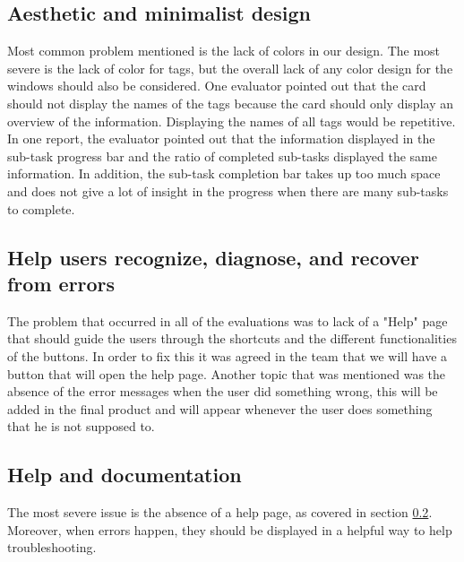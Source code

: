 \subsection{Aesthetic and minimalist design}
Most common problem mentioned is the lack of colors in our design. The most severe is the lack of color for tags, but the overall lack of any color design for the windows should also be considered. One evaluator pointed out that the card should not display the names of the tags because the card should only display an overview of the information. Displaying the names of all tags would be repetitive. In one report, the evaluator pointed out that the information displayed in the sub-task progress bar and the ratio of completed sub-tasks displayed the same information. In addition, the sub-task completion bar takes up too much space and does not give a lot of insight in the progress when there are many sub-tasks to complete.


\subsection{Help users recognize, diagnose, and recover from errors} \label{9-help}
The problem that occurred in all of the evaluations was to lack of a "Help" page that should guide the users through the shortcuts and the different functionalities of the buttons. In order to fix this it was agreed in the team that we will have a button that will open the help page. Another topic that was mentioned was the absence of the error messages when the user did something wrong, this will be added in the final product and will appear whenever the user does something that he is not supposed to.

\subsection{Help and documentation}

The most severe issue is the absence of a help page, as covered in section \ref{9-help}. Moreover, when errors happen, they should be displayed in a helpful way to help troubleshooting. 